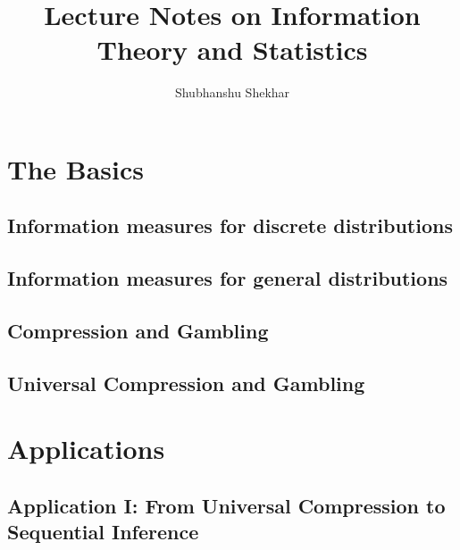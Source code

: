 \documentclass{book}
\title{Lecture Notes on Information Theory and Statistics}
\author{Shubhanshu Shekhar}
\date{}
\begin{document}
\maketitle
\tableofcontents

\part{The Basics}
    \chapter{Information measures for discrete distributions}
        
    
    \chapter{Information measures for general distributions}
        
    
    \chapter{Compression and Gambling}
            

    \chapter{Universal Compression and Gambling}
        
    
  
\part{Applications}

    \chapter{Application I: From Universal Compression to Sequential Inference}
    

    

\newpage 


\end{document}
